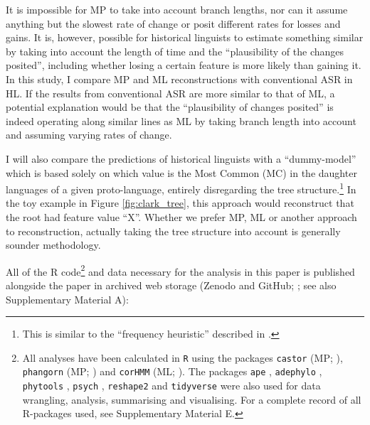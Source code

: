 \documentclass[12pt,letterpaper]{article}
\begin{document}
It is impossible for MP to take into account branch lengths, nor can it assume anything but the slowest rate of change or posit different rates for losses and gains. It is, however, possible for historical linguists to estimate something similar by taking into account the length of time and the ``plausibility of the changes posited'', including whether losing a certain feature is more likely than gaining it. In this study, I compare MP and ML reconstructions with conventional ASR in HL. If the results from conventional ASR are more similar to that of ML, a potential explanation would be that the ``plausibility of changes posited'' is indeed operating along similar lines as ML by taking branch length into account and assuming varying rates of change.

I will also compare the predictions of historical linguists with a ``dummy-model'' which is based solely on which value is the Most Common (MC) in the daughter languages of a given proto-language, entirely disregarding the tree structure.\footnote{This is similar to the ``frequency heuristic'' described in \citet{goldstein_2022}.} In the toy example in Figure \ref{fig:clark_tree}, this approach would reconstruct that the root had feature value ``X''. Whether we prefer MP, ML or another approach to reconstruction, actually taking the tree structure into account is generally sounder methodology. %


All of the R code\footnote{All analyses have been calculated in \texttt{R} \citep{R} using the packages \texttt{castor} (MP; \citet{louca2017efficient}), \texttt{phangorn} (MP; \citealt{phangorn}) and \texttt{corHMM} (ML; \citealt{R-corHMM}). The packages \texttt{ape} \citep{paradis2004ape}, \texttt{adephylo} \citep{jombart2017package}, \texttt{phytools} \citep{revell2012phytools}, \texttt{psych} \citep{psych_r_package},  \texttt{reshape2} \citep{wickham2020reshape2} and \texttt{tidyverse} \citep{tidyverse13} were also used for data wrangling, analysis, summarising and visualising. For a complete record of all R-packages used, see Supplementary Material E.} and data necessary for the analysis in this paper is published alongside the paper in archived web storage (Zenodo and GitHub; \citep{hedvig_skirgard_2023_8370386}; see also Supplementary Material A): 
\end{document}
